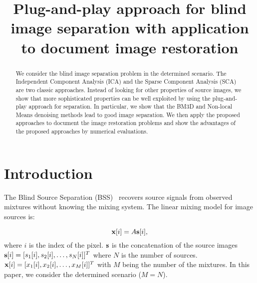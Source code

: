 \documentclass[conference]{IEEEtran}
\theoremstyle{plain}
\begin{document}
\title{Plug-and-play approach for blind image separation with application to document image restoration}

\author{
}	

\maketitle

\begin{abstract}
We consider the blind image separation problem in the determined scenario. The Independent Component Analysis (ICA) and the Sparse Component Analysis (SCA) are two classic approaches. Instead of looking for other properties of source images, we show that more sophisticated properties can be well exploited by using the plug-and-play approach for separation. In particular, we show that the BM3D and Non-local Means denoising methods lead to good image separation. We then apply the proposed approaches to document the image restoration problems and show the advantages of the proposed approaches by numerical evaluations. 
\end{abstract}


\section{Introduction}
The Blind Source Separation (BSS)~\cite{comon2010handbook} recovers source signals from observed mixtures without knowing the mixing system. The linear mixing model for image sources is:

\begin{equation}
\label{eq: linear mixing}
\bx[i] = A \bs[i],
\end{equation}
where $i$ is the index of the pixel. ${\mathbf s}$ is the concatenation of the source images ${\mathbf s}[i] = [s_1[i], s_2[i], \ldots, s_N[i]]^T$ where $N$ is the number of sources. ${\mathbf x}[i] = [x_1[i], x_2[i], \ldots, x_M[i]]^T$ with $M$ being the number of the mixtures. In this paper, we consider the determined scenario ($M = N$).
\end{document}
